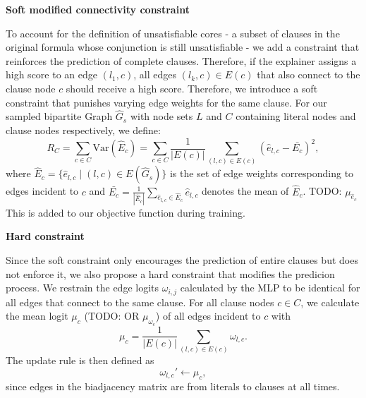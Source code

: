 \textbf{Soft modified connectivity constraint}

To account for the definition of unsatisfiable cores - a subset of clauses in the original formula whose conjunction is still unsatisfiable - we add a constraint that reinforces the prediction of complete clauses. Therefore, if the explainer assigns a high score to an edge $(l_1,c)$, all edges $(l_k,c) \in E(c)$ that also connect to the clause node $c$ should receive a high score. Therefore, we introduce a soft constraint that punishes varying edge weights for the same clause. For our sampled bipartite Graph $\hat{G}_s$ with node sets $L$ and $C$ containing literal nodes and clause nodes respectively, we define:
\begin{equation*}
    R_C = \sum_{c \in C}  \text{Var}(\hat{E}_c) = \sum_{c \in C} \frac{1}{|E(c)|} \sum_{(l,c) \in E(c)} (\hat{e}_{l,c} - \bar{E_c})^2,
\end{equation*}
where $\hat{E}_c = \{\hat{e}_{l,c} \mid (l,c)\in E(\hat{G}_s)\}$ is the set of edge weights corresponding to edges incident to $c$ and $\bar{E_c} = \frac{1}{|\hat{E}_c|}\sum_{\hat{e}_{l,c} \in \hat{E}_c} \hat{e}_{l,c}$ denotes the mean of $\hat{E}_c$. TODO: $\mu_{\hat{e}_c}$ This is added to our objective function during training. \bigskip


\textbf{Hard constraint}

Since the soft constraint only encourages the prediction of entire clauses but does not enforce it, we also propose a hard constraint that modifies the predicion process. We restrain the edge logits $\omega_{i,j}$ calculated by the MLP to be identical for all edges that connect to the same clause. %
For all clause nodes $c \in C$, we calculate the mean logit $\mu_c$ (TODO: OR $ \mu_{\omega_c}$) of all edges incident to $c$ with
\begin{equation}
    \mu_c = \frac{1}{|E(c)|} \sum_{(l,c)\in E(c)}\omega_{l,c}.
\end{equation}
The update rule is then defined as 
\begin{equation}
    \omega_{l,c}'\leftarrow \mu_c,
\end{equation}
since edges in the biadjacency matrix are from literals to clauses at all times.



